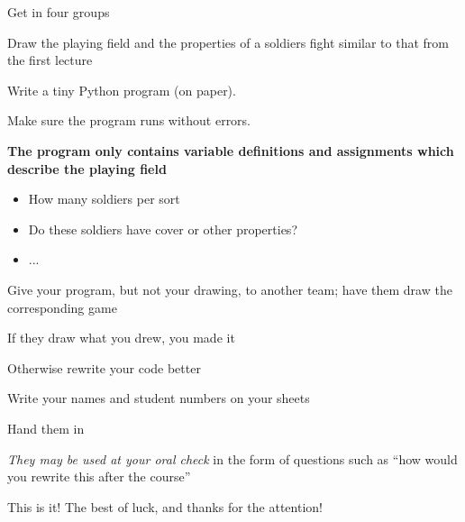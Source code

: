 \documentclass{beamer}
\begin{document}
\begin{slide}{
\item Get in four groups
\item Draw the playing field and the properties of a soldiers fight similar to that from the first lecture
\item Write a tiny Python program (on paper).
\item Make sure the program runs without errors.
\item \textbf{The program only contains variable definitions and assignments which describe the playing field}
\begin{itemize}
\item How many soldiers per sort
\item Do these soldiers have cover or other properties?
\item ...
\end{itemize}
\item Give your program, but not your drawing, to another team; have them draw the corresponding game
\item If they draw what you drew, you made it
\item Otherwise rewrite your code better
}\end{slide}

\begin{slide}{
\item Write your names and student numbers on your sheets
\item Hand them in
\item \textit{They may be used at your oral check} in the form of questions such as ``how would you rewrite this after the course''
}\end{slide}

\begin{frame}{This is it!}
\center
\fontsize{18pt}{7.2}\selectfont
The best of luck, and thanks for the attention!
\end{frame}
\end{document}
